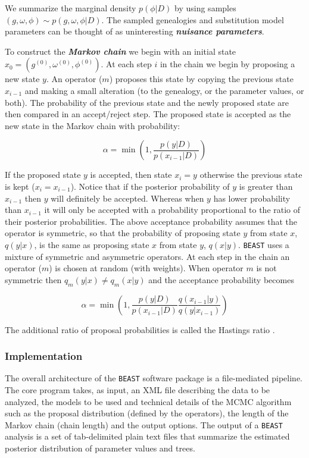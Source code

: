 \documentclass[cup7b, english]{cupbook}
\begin{document}
We summarize the marginal density $p(\phi|D)$ by using samples
$(g, \omega, \phi) \sim p(g, \omega, \phi|D)$. The sampled genealogies and
substitution model parameters can be thought of as uninteresting \textbf{\textit{nuisance
parameters}}.

To construct the \textbf{\textit{Markov chain}} we begin with an initial state
$x_0 = (g^{(0)}, \omega^{(0)}, \phi^{(0)})$. At each step $i$ in the chain we begin
by proposing a new state $y$. An operator ($m$) proposes this state by copying
the previous state $x_{i-1}$ and making a small alteration (to the genealogy, or the parameter values, or both).
The probability of the previous state and the newly proposed state are then compared in an accept/reject step.
The proposed state is accepted as the new state in the Markov chain with probability:

\begin{equation}
\alpha = \min \left(1,\frac{p(y|D)}{p(x_{i-1}|D)} \right)
\end{equation}

If the proposed state $y$ is accepted, then state $x_i = y$ otherwise the previous
state is kept ($x_i = x_{i-1}$). Notice that if the posterior probability of $y$ is greater than $x_{i-1}$
then $y$ will definitely be accepted. Whereas when $y$ has lower probability than $x_{i-1}$ it
will only be accepted with a probability proportional to the ratio of their posterior probabilities.
The above acceptance probability assumes that the operator is symmetric, so that
the probability of proposing state $y$ from state $x$, $q(y|x)$, is the same as proposing state $x$ from
state $y$, $q(x|y)$. \texttt{BEAST} uses a mixture of symmetric and asymmetric operators. At each step in the chain
an operator ($m$) is chosen at random (with weights). When operator $m$ is
not symmetric then $q_m(y|x) \neq q_m(x|y)$ and the acceptance probability becomes

\begin{equation}
\alpha = \min \left(1,\frac{p(y|D)}{p(x_{i-1}|D)}\frac{q(x_{i-1}|y)}{q(y|x_{i-1})}\right)
\end{equation}

The additional ratio of proposal probabilities is called the Hastings ratio \cite{Hastings1970}.

\subsubsection{Implementation}

The overall architecture of the \texttt{BEAST} software package is a file-mediated
pipeline. The core program takes, as input, an XML file describing
the data to be analyzed, the models to be used and technical details
of the MCMC algorithm such as the proposal distribution (defined by the operators),
the length of the Markov chain (chain length) and the output options. The output of a \texttt{BEAST} analysis
is a set of tab-delimited plain text files that summarize the estimated
posterior distribution of parameter values and trees.
\end{document}
